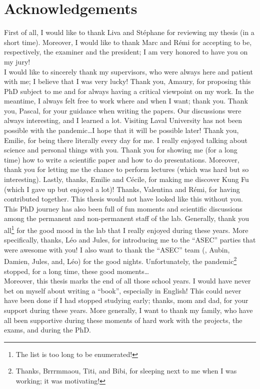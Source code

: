 \chapter*{Acknowledgements}

First of all, I would like to thank Liva and Stéphane for reviewing my thesis (in a short time).
Moreover, I would like to thank Marc and Rémi for accepting to be, respectively, the examiner and the president; I am very honored to have you on my jury!
\\

I would like to sincerely thank my supervisors, who were always here and patient with me; I believe that I was very lucky!
Thank you, Amaury, for proposing this PhD subject to me and for always having a critical viewpoint on my work.
In the meantime, I always felt free to work where and when I want; thank you.
Thank you, Pascal, for your guidance when writing the papers. 
Our discussions were always interesting, and I learned a lot.
Visiting Laval University has not been possible with the pandemic\dots I hope that it will be possible later!
Thank you, Emilie, for being there literally every day for me. 
I really enjoyed talking about science and personal things with you.
Thank you for showing me (for a long time) how to write a scientific paper and how to do presentations.
Moreover, thank you for letting me the chance to perform lectures (which was hard but so interesting).
Lastly, thanks, Emilie and Cécile, for making me discover Kung Fu (which I gave up but enjoyed a lot)!
Thanks, Valentina and Rémi, for having contributed together. 
This thesis would not have looked like this without you.\\

This PhD journey has also been full of fun moments and scientific discussions among the permanent and non-permanent staff of the lab.
Generally, thank you all\footnote{The list is too long to be enumerated!} for the good mood in the lab that I really enjoyed during these years.
More specifically, thanks, Léo and Jules, for introducing me to the ``ASEC'' parties that were awesome with you!
I also want to thank the ``ASEC'' team (\ie, Aubin, Damien, Jules, and, Léo) for the good nights.
Unfortunately, the pandemic\footnote{Thanks, Brrrmmaou, Titi, and Bibi, for sleeping next to me when I was working; it was motivating!} stopped, for a long time, these good moments\dots\\

Moreover, this thesis marks the end of all those school years. 
I would have never bet on myself about writing a ``book'', especially in English!
This could never have been done if I had stopped studying early; thanks, mom and dad, for your support during these years.
More generally, I want to thank my family, who have all been supportive during these moments of hard work with the projects, the exams, and during the PhD.\\

